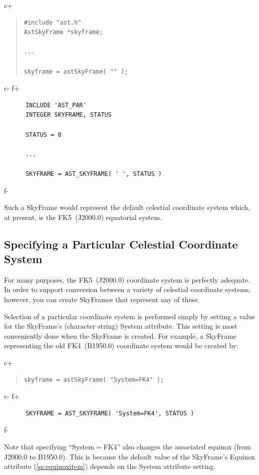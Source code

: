 \documentclass[twoside,11pt]{article}
\newcommand{\secref}[1]{\S\ref{#1}}
\renewcommand{\secref}[1]{\ref{#1}}
\begin{document}
c+
\begin{quote}
\small
\begin{verbatim}
#include "ast.h"
AstSkyFrame *skyframe;

...

skyframe = astSkyFrame( "" );
\end{verbatim}
\normalsize
\end{quote}
c-
f+
\small
\begin{verbatim}
      INCLUDE 'AST_PAR'
      INTEGER SKYFRAME, STATUS

      STATUS = 0

      ...

      SKYFRAME = AST_SKYFRAME( ' ', STATUS )
\end{verbatim}
\normalsize
f-

Such a SkyFrame would represent the default celestial coordinate
system which, at present, is the FK5~(J2000.0) equatorial system.

\subsection{Specifying a Particular Celestial Coordinate System}

For many purposes, the FK5~(J2000.0) coordinate system is perfectly
adequate. In order to support conversion between a variety of
celestial coordinate systems, however, you can create SkyFrames that
represent any of these.

Selection of a particular coordinate system is performed simply by
setting a value for the SkyFrame's (character string) System
attribute. This setting is most conveniently done when the SkyFrame is
created. For example, a SkyFrame representing the old FK4~(B1950.0)
coordinate system would be created by:

c+
\begin{quote}
\small
\begin{verbatim}
skyframe = astSkyFrame( "System=FK4" );
\end{verbatim}
\normalsize
\end{quote}
c-
f+
\small
\begin{verbatim}
      SKYFRAME = AST_SKYFRAME( 'System=FK4', STATUS )
\end{verbatim}
\normalsize
f-

Note that specifying ``System$=$FK4'' also changes the associated
equinox (from J2000.0 to B1950.0). This is because the default value
of the SkyFrame's Equinox attribute (\secref{ss:equinoxitem}) depends
on the System attribute setting.
\end{document}
